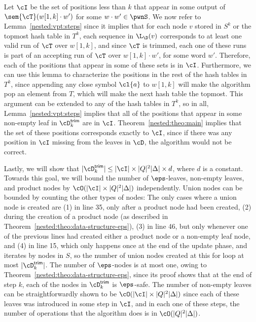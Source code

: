 Let $\cI$ be the set of positions less than $k$ that appear in some output of $\sem{\cT}(w[1,k] \cdot w')$ for some $w \cdot w'\in \pwnS$. We now refer to Lemma~\ref{nested:vpt:steps} since it implies that for each node $v$ stored in $S^k$ or the topmost hash table in $T^k$, each sequence in $\L_{\D}(v)$ corresponds to at least one valid run of $\cT$ over $w[1,k]$, and since $\cT$ is trimmed, each one of these runs is part of an accepting run of $\cT$ over $w[1,k] \cdot w'$, for some word $w'$. Therefore, each of the positions that appear in some of these sets is in $\cI$. Furthermore, we can use this lemma to characterize the positions in the rest of the hash tables in $T^k$, since appending any close symbol $\cl{a}$ to $w[1,k]$ will make the algorithm pop an element from $T$, which will make the next hash table the topmost. This argument can be extended to any of the hash tables in $T^k$, so in all, Lemma~\ref{nested:vpt:steps} implies that all of the positions that appear in some non-empty leaf in $\cD^{\textsf{trim}}_k $ are in $\cI$. Theorem~\ref{nested:theo:main} implies that the set of these positions corresponds exactly to $\cI$, since if there was any position in $\cI$ missing from the leaves in $\cD$, the algorithm would not be correct.

Lastly, we will show that $| \cD^{\textsf{trim}}_k | \leq | \cI | \times |Q|^2|\Delta| \times d$, where $d$ is a constant. Towards this goal, we will bound the number of $\eps$-leaves, non-empty leaves, and product nodes by $\cO(| \cI | \times |Q|^2|\Delta|)$ independently. Union nodes can be bounded by counting the other types of nodes: The only cases where a union node is created are (1) in line 35, only after a product node had been created, (2) during the creation of a product node (as described in Theorem~\ref{nested:theo:data-structure-eps}), (3) in line 46, but only whenever one of the previous lines had created either a product node or a non-empty leaf node, and (4) in line 15, which only happens once at the end of the update phase, and iterates by nodes in $S$, so the number of union nodes created at this for loop at most $| \cD^{\textsf{trim}}_k |$. The number of $\eps$-nodes is at most one, owing to Theorem~\ref{nested:theo:data-structure-eps}, since its proof shows that at the end of step $k$, each of the nodes in $\cD^{\textsf{trim}}_k$ is $\eps$-safe. The number of non-empty leaves can be straightforwardly shown to be $\cO(| \cI | \times |Q|^2|\Delta|)$ since each of these leaves was introduced in some step in $\cI$, and in each one of these steps, the number of operations that the algorithm does is in $\cO(|Q|^2|\Delta|)$. 

